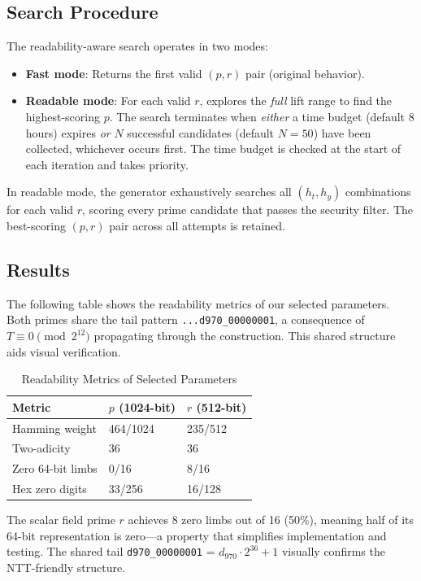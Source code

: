 \subsection{Search Procedure}\label{search-procedure}

The readability-aware search operates in two modes:

\begin{itemize}
\tightlist
\item
  \textbf{Fast mode}: Returns the first valid \((p, r)\) pair (original
  behavior).
\item
  \textbf{Readable mode}: For each valid \(r\), explores the \emph{full}
  lift range to find the highest-scoring \(p\). The search terminates
  when \emph{either} a time budget (default 8 hours) expires \emph{or}
  \(N\) successful candidates (default \(N = 50\)) have been collected,
  whichever occurs first. The time budget is checked at the start of
  each iteration and takes priority.
\end{itemize}

In readable mode, the generator exhaustively searches all \((h_t, h_y)\)
combinations for each valid \(r\), scoring every prime candidate that
passes the security filter. The best-scoring \((p, r)\) pair across all
attempts is retained.

\subsection{Results}\label{results}

The following table shows the readability metrics of our selected
parameters. Both primes share the tail pattern
\texttt{...d970\_00000001}, a consequence of
\(T \equiv 0 \pmod{2^{12}}\) propagating through the construction. This
shared structure aids visual verification.

\begin{table}[t]
\centering
\caption{Readability Metrics of Selected Parameters}
\begin{tabular}{lll}
\toprule
Metric & \(p\) (1024-bit) & \(r\) (512-bit) \\
\midrule
Hamming weight & 464/1024 & 235/512 \\
Two-adicity & 36 & 36 \\
Zero 64-bit limbs & 0/16 & 8/16 \\
Hex zero digits & 33/256 & 16/128 \\
\bottomrule
\end{tabular}
\end{table}

The scalar field prime \(r\) achieves 8 zero limbs out of 16 (50\%),
meaning half of its 64-bit representation is zero---a property that
simplifies implementation and testing. The shared tail
\texttt{d970\_00000001} = \(d_{970} \cdot 2^{36} + 1\) visually confirms
the NTT-friendly structure.
